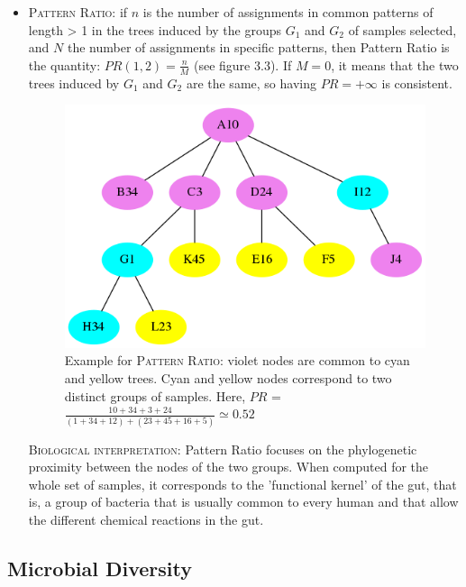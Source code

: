 \documentclass{report}
\begin{document}
\begin{itemize} 
\item \textsc{Pattern Ratio:} if $n$ is the number of assignments in common patterns of length > 1 in the trees induced by the groups $G_{1}$ and $G_{2}$ of samples selected, and $N$ the number of assignments in specific patterns, then Pattern Ratio is the quantity: $PR(1,2) = \frac{n}{M}$ (see figure $3.3$). If $M = 0$, it means that the two trees induced by $G_{1}$ and $G_{2}$ are the same, so having $PR = +\infty$ is consistent.

\begin{figure}[H]
\centering
\includegraphics[scale=0.5]{illustrations/patternratio.png}
\caption{Example for \textsc{Pattern Ratio}: violet nodes are common to cyan and yellow trees. Cyan and yellow nodes correspond to two distinct groups of samples. Here, $PR$ = $\frac{10 + 34 + 3 + 24}{(1 + 34 + 12) + (23 + 45 + 16 + 5)} \simeq 0.52$}
\end{figure}

\bigskip

  \textsc{Biological interpretation:} Pattern Ratio focuses on the phylogenetic proximity between the nodes of the two groups. When computed for the whole set of samples, it corresponds to the 'functional kernel' of the gut, that is, a group of bacteria that is usually common to every human and that allow the different chemical reactions in the gut. 

\end{itemize}

\subsection{Microbial Diversity}
\end{document}
